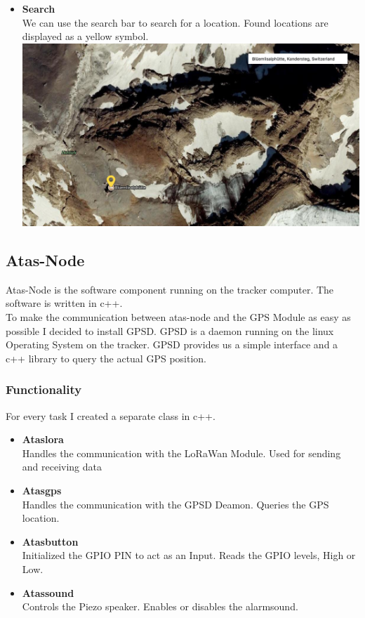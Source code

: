 \documentclass[a4paper,11pt, oneside]{report}
\theoremstyle{definition}
\begin{document}
\begin{itemize}
\newpage
\item \textbf{Search}\\
We can use the search bar to search for a location. Found locations are displayed as a yellow symbol.\\[0.3cm]
\includegraphics[width=\textwidth]{img/atas-web-search.png}\\

\end{itemize}

\newpage
  
\subsection{Atas-Node}  
Atas-Node is the software component running on the tracker computer. The software is written in c++.\\[0.3cm]
To make the communication between atas-node and the GPS Module as easy as possible I decided to install GPSD. GPSD is a daemon running on the linux Operating System on the tracker. GPSD provides us a simple interface and a c++ library to query the actual GPS position.

\subsubsection{Functionality}
For every task I created a separate class in c++.
\begin{itemize}
\item \textbf{Ataslora}\\
Handles the communication with the LoRaWan Module. Used for sending and receiving data
\item \textbf{Atasgps}\\
Handles the communication with the GPSD Deamon. Queries the GPS location.
\item \textbf{Atasbutton}\\
Initialized the GPIO PIN to act as an Input. Reads the GPIO levels, High or Low.
\item \textbf{Atassound}\\
Controls the Piezo speaker. Enables or disables the alarmsound.
\end{itemize}
\end{document}
